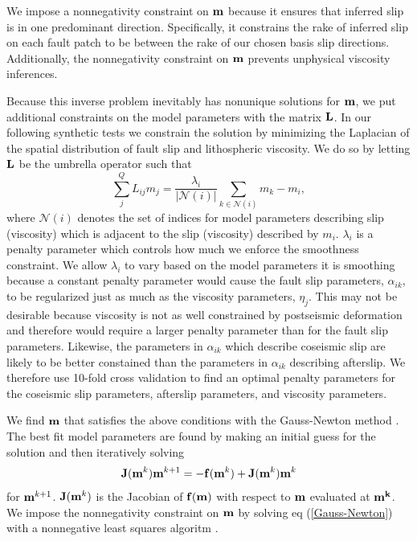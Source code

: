\documentclass[fleqn,12pt]{article}
\begin{document}
We impose a nonnegativity constraint on $\bold{m}$ because it
ensures that inferred slip is in one predominant direction.
Specifically, it constrains the rake of inferred slip on each fault
patch to be between the rake of our chosen basis slip
directions. Additionally, the nonnegativity constraint on $\bold{m}$
prevents unphysical viscosity inferences.

Because this inverse problem inevitably has nonunique solutions for
$\bold{m}$, we put additional constraints on the model parameters with
the matrix $\bold{L}$.  In our following synthetic tests we constrain
the solution by minimizing the Laplacian of the spatial distribution
of fault slip and lithospheric viscosity.  We do so by letting
$\bold{L}$ be the umbrella operator \citep{D1999} such that
\begin{equation}
  \sum_j^{Q}L_{ij}m_j = \frac{\lambda_i}{|\mathcal{N}(i)|}\sum_{k\in \mathcal{N}(i)} m_k - m_i,
\end{equation}
where $\mathcal{N}(i)$ denotes the set of indices for model parameters
describing slip (viscosity) which is adjacent to the slip (viscosity)
described by $m_i$. $\lambda_i$ is a penalty parameter which controls
how much we enforce the smoothness constraint. We allow $\lambda_i$ to
vary based on the model parameters it is smoothing because a constant
penalty parameter would cause the fault slip parameters,
$\alpha_{ik}$, to be regularized just as much as the viscosity
parameters, $\eta_j$.  This may not be desirable because viscosity is
not as well constrained by postseismic deformation and therefore would
require a larger penalty parameter than for the fault slip
parameters. Likewise, the parameters in $\alpha_{ik}$ which describe
coseismic slip are likely to be better constained than the parameters
in $\alpha_{ik}$ describing afterslip.  We therefore use 10-fold cross
validation to find an optimal penalty parameters for the coseismic
slip parameters, afterslip parameters, and viscosity parameters.

We find $\bold{m}$ that satisfies the above conditions with the
Gauss-Newton method \citep[e.g.][]{A2013}.  The best fit model parameters are
found by making an initial guess for the solution and then iteratively
solving
\begin{equation}\label{Gauss-Newton}
\bold{J}(\bold{m}^{k})\bold{m}^{k+1} = -\bold{f}(\bold{m}^k) + \bold{J}(\bold{m}^{k})\bold{m}^{k}
\end{equation}
for $\bold{m}^{k+1}$.  $\bold{J}(\bold{m}^k)$ is the Jacobian of
$\bold{f(m)}$ with respect to $\bold{m}$ evaluated at $\bold{m^k}$. We
impose the nonnegativity constraint on $\bold{m}$ by solving eq
(\ref{Gauss-Newton}) with a nonnegative least squares algoritm
\citep{LH1974}.
\end{document}
